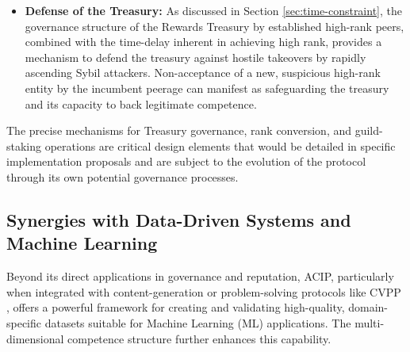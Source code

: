\documentclass{article}
\begin{document}
\begin{CJK}{UTF8}{gbsn}
\begin{itemize}
        \item \textbf{Defense of the Treasury:} As discussed in Section \ref{sec:time-constraint}, the governance structure of the Rewards Treasury by established high-rank peers, combined with the time-delay inherent in achieving high rank, provides a mechanism to defend the treasury against hostile takeovers by rapidly ascending Sybil attackers. Non-acceptance of a new, suspicious high-rank entity by the incumbent peerage can manifest as safeguarding the treasury and its capacity to back legitimate competence.

    \end{itemize}
    The precise mechanisms for Treasury governance, rank conversion, and guild-staking operations are critical design elements that would be detailed in specific implementation proposals and are subject to the evolution of the protocol through its own potential governance processes.

    \subsection{Synergies with Data-Driven Systems and Machine Learning}
    \label{sec:ml_synergies}

    Beyond its direct applications in governance and reputation, ACIP, particularly when integrated with content-generation or problem-solving protocols like CVPP \cite{cvpp}, offers a powerful framework for creating and validating high-quality, domain-specific datasets suitable for Machine Learning (ML) applications. The multi-dimensional competence structure further enhances this capability.


\end{CJK}
\end{document}
